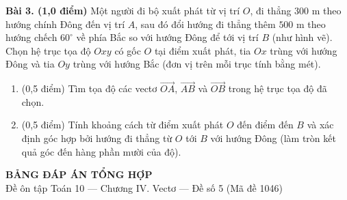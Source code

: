 \documentclass[10pt,a4paper]{article}
\begin{document}
\textbf{Bài 3. (1,0 điểm)} Một người đi bộ xuất phát từ vị trí $O$, đi thẳng $300\text{ m}$ theo hướng chính Đông đến vị trí $A$, sau đó đổi hướng đi thẳng thêm $500\text{ m}$ theo hướng chếch $60^\circ$ về phía Bắc so với hướng Đông để tới vị trí $B$ (như hình vẽ). Chọn hệ trục tọa độ $Oxy$ có gốc $O$ tại điểm xuất phát, tia $Ox$ trùng với hướng Đông và tia $Oy$ trùng với hướng Bắc (đơn vị trên mỗi trục tính bằng mét).
\par\noindent\begin{minipage}[t]{0.66\linewidth}
\begin{enumerate}[label=\alph*), leftmargin=0.6cm, itemsep=2pt]
    \item (0,5 điểm) Tìm tọa độ các vectơ $\vec{OA}$, $\vec{AB}$ và $\vec{OB}$ trong hệ trục tọa độ đã chọn.
    \item (0,5 điểm) Tính khoảng cách từ điểm xuất phát $O$ đến điểm đến $B$ và xác định góc hợp bởi hướng đi thẳng từ $O$ tới $B$ với hướng Đông (làm tròn kết quả góc đến hàng phần mười của độ).
\end{enumerate}
\end{minipage}\hfill
\begin{minipage}[t]{0.32\linewidth}\raggedleft\vspace{-10pt}
\end{minipage}


\newpage
\pagestyle{dapan}
\setcounter{page}{1}

\begin{center}
  {\Large\bfseries\color{ink} BẢNG ĐÁP ÁN TỔNG HỢP}\\[2pt]
  {\small\color{gray!75!black} Đề ôn tập Toán 10 — Chương IV. Vectơ — Đề số 5 (Mã đề 1046)}
\end{center}
\vspace{1pt}
\end{document}
